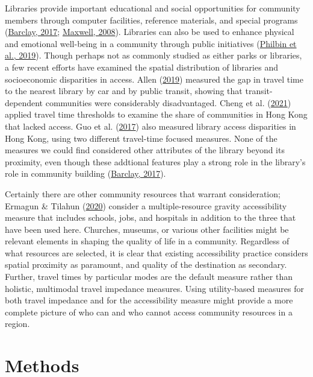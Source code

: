\documentclass[review, 3p]{elsarticle} %
\begin{document}
Libraries provide important educational and social opportunities for community
members through computer facilities, reference materials, and special programs
(\protect\hyperlink{ref-barclay2017space}{Barclay, 2017}; \protect\hyperlink{ref-maxwell2008libraries}{Maxwell, 2008}). Libraries can also be used to
enhance physical and emotional well-being in a community through public
initiatives (\protect\hyperlink{ref-philbin2019}{Philbin et al., 2019}). Though perhaps not as commonly studied as either
parks or libraries, a few recent efforts have examined the spatial distribution
of libraries and socioeconomic disparities in access. Allen (\protect\hyperlink{ref-allen2019}{2019}) measured the
gap in travel time to the nearest library by car and by public transit, showing
that transit-dependent communities were considerably disadvantaged. Cheng et al. (\protect\hyperlink{ref-cheng2021}{2021})
applied travel time thresholds to examine the share of communities in Hong Kong
that lacked access. Guo et al. (\protect\hyperlink{ref-guo2017}{2017}) also measured library access disparities in Hong Kong,
using two different travel-time focused measures. None of the measures we could
find considered other attributes of the library beyond its proximity, even though
these addtional features play a strong role in the library's role in community building
(\protect\hyperlink{ref-barclay2017space}{Barclay, 2017}).

Certainly there are other community resources that warrant consideration;
Ermagun \& Tilahun (\protect\hyperlink{ref-ermagun2020}{2020}) consider a multiple-resource gravity accessibility measure that
includes schools, jobs, and hospitals in addition to the three that have been used here.
Churches, museums, or various other facilities might be relevant elements
in shaping the quality of life in a community. Regardless of what resources
are selected, it is clear that existing accessibility practice considers spatial
proximity as paramount, and quality of the destination as secondary. Further,
travel times by particular modes are the default measure rather than holistic,
multimodal travel impedance measures. Using utility-based measures for both
travel impedance and for the accessibility measure might provide a more
complete picture of who can and who cannot access community resources in a region.

\hypertarget{methods}{%
\section{Methods}\label{methods}}
\end{document}
